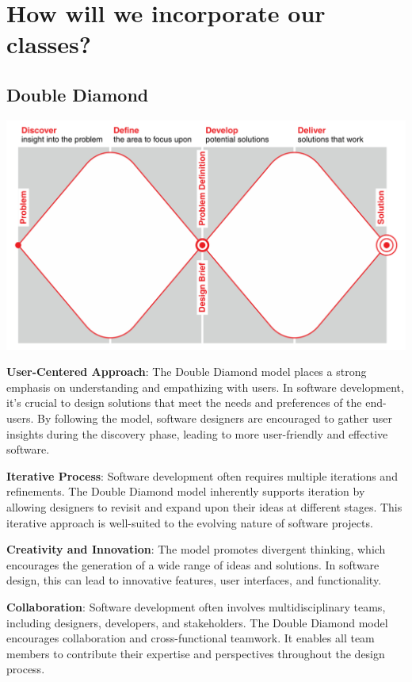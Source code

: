\documentclass[ansiapaper,12pt]{article}
\begin{document}
\section{How will we incorporate our classes?}

\subsection{Double Diamond}

\includegraphics[width=\textwidth]{double-diamond.png}


\textbf{User-Centered Approach}: The Double Diamond model places a strong emphasis on understanding and empathizing with users. In software development, it's crucial to design solutions that meet the needs and preferences of the end-users. By following the model, software designers are encouraged to gather user insights during the discovery phase, leading to more user-friendly and effective software.

\textbf{Iterative Process}: Software development often requires multiple iterations and refinements. The Double Diamond model inherently supports iteration by allowing designers to revisit and expand upon their ideas at different stages. This iterative approach is well-suited to the evolving nature of software projects.

\textbf{Creativity and Innovation}: The model promotes divergent thinking, which encourages the generation of a wide range of ideas and solutions. In software design, this can lead to innovative features, user interfaces, and functionality.

\textbf{Collaboration}: Software development often involves multidisciplinary teams, including designers, developers, and stakeholders. The Double Diamond model encourages collaboration and cross-functional teamwork. It enables all team members to contribute their expertise and perspectives throughout the design process.
\end{document}
